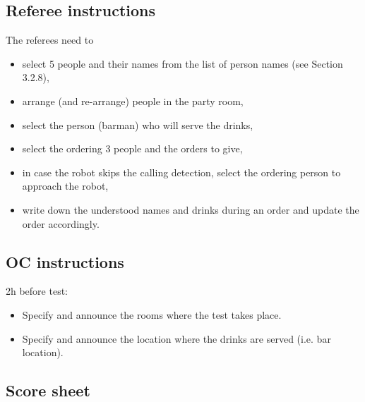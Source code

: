 \subsection{Referee instructions}

The referees need to
\begin{itemize}
	\item select 5 people and their names from the list of person names (see Section 3.2.8),
	\item arrange (and re-arrange) people in the party room,
	\item select the person (barman) who will serve the drinks,
	\item select the ordering 3 people and the orders to give,
	\item in case the robot skips the calling detection, select the ordering person to approach the robot,
	\item write down the understood names and drinks during an order and update the order accordingly.
\end{itemize}

\subsection{OC instructions}

2h before test:
\begin{itemize}
	\item Specify and announce the rooms where the test takes place.
	\item Specify and announce the location where the drinks are served (i.e. bar location).
\end{itemize}

\newpage
\subsection{Score sheet}

